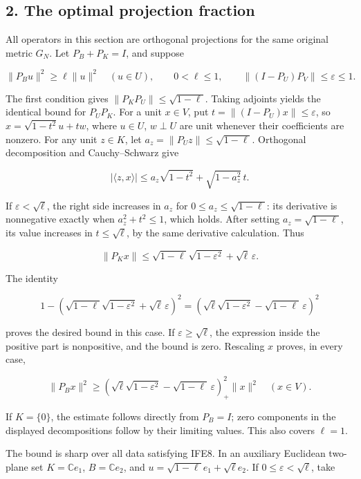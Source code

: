 \documentclass[11pt]{article}
\begin{document}
\subsection{2. The optimal projection fraction}\label{the-optimal-projection-fraction}

All operators in this section are orthogonal projections for the same original metric \(G_N\). Let \(P_B+P_K=I\), and suppose

\[
\|P_Bu\|^2\ge\ell\|u\|^2\quad(u\in U),
\qquad 0<\ell\le1,
\qquad \|(I-P_U)P_V\|\le\varepsilon\le1.
\tag{IFE8}
\]

The first condition gives \(\|P_KP_U\|\le\sqrt{1-\ell}\). Taking adjoints yields the identical bound for \(P_UP_K\). For a unit \(x\in V\), put \(t=\|(I-P_U)x\|\le\varepsilon\), so \(x=\sqrt{1-t^2}u+tw\), where \(u\in U\), \(w\perp U\) are unit whenever their coefficients are nonzero. For any unit \(z\in K\), let \(a_z=\|P_Uz\|\le\sqrt{1-\ell}\). Orthogonal decomposition and Cauchy--Schwarz give

\[
|\langle z,x\rangle|
\le a_z\sqrt{1-t^2}+\sqrt{1-a_z^2}\,t.
\tag{IFE9}
\]

If \(\varepsilon<\sqrt\ell\), the right side increases in \(a_z\) for \(0\le a_z\le\sqrt{1-\ell}\): its derivative is nonnegative exactly when \(a_z^2+t^2\le1\), which holds. After setting \(a_z=\sqrt{1-\ell}\), its value increases in \(t\le\sqrt\ell\), by the same derivative calculation. Thus

\[
\|P_Kx\|\le
\sqrt{1-\ell}\sqrt{1-\varepsilon^2}+\sqrt\ell\,\varepsilon.
\]

The identity

\[
1-\left(\sqrt{1-\ell}\sqrt{1-\varepsilon^2}
+\sqrt\ell\,\varepsilon\right)^2
=\left(\sqrt\ell\sqrt{1-\varepsilon^2}
-\sqrt{1-\ell}\,\varepsilon\right)^2
\]

proves the desired bound in this case. If \(\varepsilon\ge\sqrt\ell\), the expression inside the positive part is nonpositive, and the bound is zero. Rescaling \(x\) proves, in every case,

\[
\boxed{\|P_Bx\|^2\ge
\left(\sqrt\ell\sqrt{1-\varepsilon^2}
-\sqrt{1-\ell}\,\varepsilon\right)_+^2\|x\|^2
\quad(x\in V).}
\tag{IFE10}
\]

If \(K=\{0\}\), the estimate follows directly from \(P_B=I\); zero components in the displayed decompositions follow by their limiting values. This also covers \(\ell=1\).

The bound is sharp over all data satisfying IFE8. In an auxiliary Euclidean two-plane set \(K=\mathbb Ce_1\), \(B=\mathbb Ce_2\), and \(u=\sqrt{1-\ell}e_1+\sqrt\ell e_2\). If \(0\le\varepsilon<\sqrt\ell\), take
\end{document}

